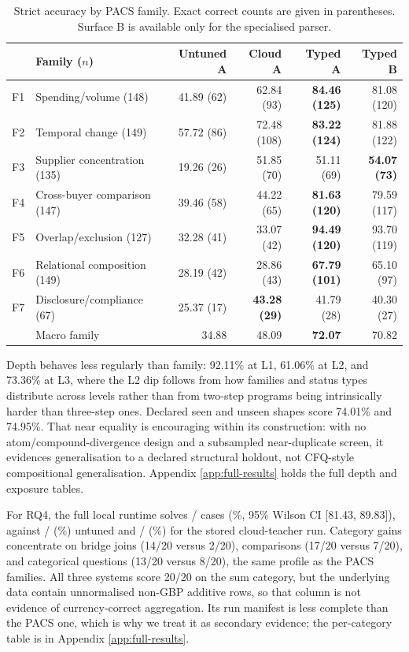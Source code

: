 \begin{table}[t]
  \caption{Strict accuracy by PACS family.  Exact correct counts are given in parentheses.
  Surface B is available only for the specialised parser.}
  \label{tab:pacs-family}
  \centering
  \small
  \begin{tabular}{llrrrr}
    \toprule
    & Family ($n$) & Untuned A & Cloud A & Typed A & Typed B \\
    \midrule
    F1 & Spending/volume (148) & 41.89 (62) & 62.84 (93) & \textbf{84.46 (125)} & 81.08 (120) \\
    F2 & Temporal change (149) & 57.72 (86) & 72.48 (108) & \textbf{83.22 (124)} & 81.88 (122) \\
    F3 & Supplier concentration (135) & 19.26 (26) & 51.85 (70) & 51.11 (69) & \textbf{54.07 (73)} \\
    F4 & Cross-buyer comparison (147) & 39.46 (58) & 44.22 (65) & \textbf{81.63 (120)} & 79.59 (117) \\
    F5 & Overlap/exclusion (127) & 32.28 (41) & 33.07 (42) & \textbf{94.49 (120)} & 93.70 (119) \\
    F6 & Relational composition (149) & 28.19 (42) & 28.86 (43) & \textbf{67.79 (101)} & 65.10 (97) \\
    F7 & Disclosure/compliance (67) & 25.37 (17) & \textbf{43.28 (29)} & 41.79 (28) & 40.30 (27) \\
    \midrule
    & Macro family & 34.88 & 48.09 & \textbf{72.07} & 70.82 \\
    \bottomrule
  \end{tabular}
\end{table}

Depth behaves less regularly than family: 92.11\% at L1, 61.06\% at L2, and 73.36\% at L3, where
the L2 dip follows from how families and status types distribute across levels rather than from
two-step programs being intrinsically harder than three-step ones.  Declared seen and unseen
shapes score 74.01\% and 74.95\%.  That near equality is encouraging within its construction:
with no atom/compound-divergence design and a subsampled near-duplicate screen, it evidences
generalisation to a declared structural holdout, not CFQ-style compositional generalisation.
Appendix \ref{app:full-results} holds the full depth and exposure tables.

For RQ4, the full local runtime solves \RuntimeOursCorrect/\RuntimeN{} cases (\RuntimeOurs\%,
95\% Wilson CI [81.43, 89.83]), against \RuntimeBaseCorrect/\RuntimeN{} (\RuntimeBase\%) untuned
and \RuntimeTeacherCorrect/\RuntimeN{} (\RuntimeTeacher\%) for the stored cloud-teacher run.
Category gains concentrate on bridge joins (14/20 versus 2/20), comparisons (17/20 versus 7/20),
and categorical questions (13/20 versus 8/20), the same profile as the PACS families.  All three
systems score 20/20 on the sum category, but the underlying data contain unnormalised non-GBP
additive rows, so that column is not evidence of currency-correct aggregation.  Its run manifest
is less complete than the PACS one, which is why we treat it as secondary evidence; the
per-category table is in Appendix \ref{app:full-results}.

